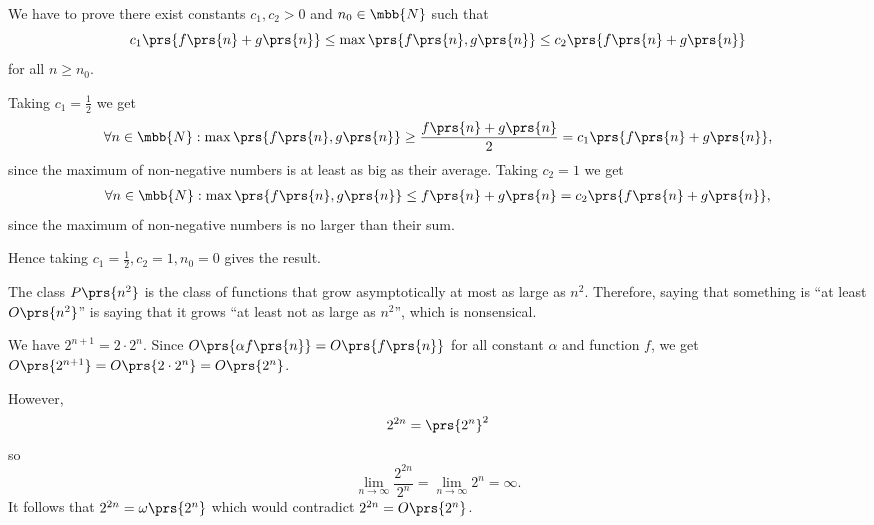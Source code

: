 \documentclass[oneside]{scrbook}
\theoremstyle{definition}
\begin{document}
\begin{exercise}
    We have to prove there exist constants $c_1, c_2 > 0$ and $n_0 \in \mbb{N}$ such that \[c_1 \prs{f\prs{n} + g\prs{n}} \leq \max\prs{f\prs{n}, g\prs{n}} \leq c_2 \prs{f\prs{n} + g\prs{n}}\]
    for all $n \geq n_0$.

    Taking $c_1 = \frac{1}{2}$ we get
    \begin{align*}
        \forall n \in \mbb{N}: \max\prs{f\prs{n}, g\prs{n}} \geq \frac{f\prs{n} + g\prs{n}}{2} = c_1\prs{f\prs{n} + g\prs{n}} \text{,}
    \end{align*}
    since the maximum of non-negative numbers is at least as big as their average.
    Taking $c_2 = 1$ we get
    \begin{align*}
        \forall n \in \mbb{N}: \max\prs{f\prs{n}, g\prs{n}} \leq f\prs{n} + g\prs{n} = c_2\prs{f\prs{n} + g\prs{n}} \text{,}
    \end{align*}
    since the maximum of non-negative numbers is no larger than their sum.

    Hence taking $c_1 = \frac{1}{2}, c_2 = 1, n_0 = 0$ gives the result.
\end{exercise}

\begin{exercise}
    The class $P\prs{n^2}$ is the class of functions that grow asymptotically at most as large as $n^2$. Therefore, saying that something is ``at least $O\prs{n^2}$'' is saying that it grows ``at least not as large as $n^2$'', which is nonsensical.
\end{exercise}

\begin{exercise}
    We have $2^{n+1} = 2 \cdot 2^n$. Since $O\prs{\alpha f\prs{n}} = O\prs{f\prs{n}}$ for all constant $\alpha$ and function $f$, we get $O\prs{2^{n+1}} = O\prs{2 \cdot 2^n} = O\prs{2^n}$.

    However,
    \[ 2^{2n} = \prs{2^n}^2 \]
    so
    \[ \lim_{n\to\infty} \frac{2^{2n}}{2^n} = \lim_{n\to\infty} 2^n = \infty \text{.} \]
    It follows that $2^{2n} = \omega\prs{2^n}$ which would contradict $2^{2n} = O\prs{2^n}$.
\end{exercise}
\end{document}
